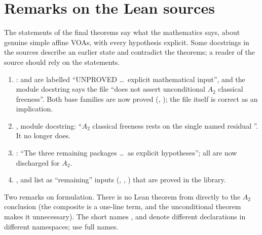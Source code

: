 \section{Remarks on the Lean sources}\label{l27:sec:defects}

The statements of the final theorems say what the mathematics says, about genuine simple affine VOAs, with every hypothesis explicit.
Some docstrings in the sources describe an earlier state and contradict the theorems; a reader of the source should rely on the
statements.
\begin{warning}[title={Docstrings that are out of date}]
\begin{enumerate}
\item {}:  and  are labelled
  ``UNPROVED \dots\ explicit mathematical input'', and the module docstring says the file ``does not assert unconditional $A_2$ classical
  freeness''. Both base families are now proved (, ); the file itself
  is correct as an implication.
\item {}, module docstring: ``$A_2$ classical freeness rests on the single named residual
  ''. It no longer does.
\item {}: ``The three remaining packages \dots\ as explicit hypotheses''; all are now discharged
  for $A_2$.
\item {},  and  list
  as ``remaining'' inputs (, , ) that are proved in the library.
\end{enumerate}
\end{warning}
Two remarks on formulation. There is no Lean theorem from  directly to the $A_2$ conclusion (the composite is a one-line
term, and the unconditional theorem makes it unnecessary). The short names , 
and  denote different declarations in different namespaces; use full names.


